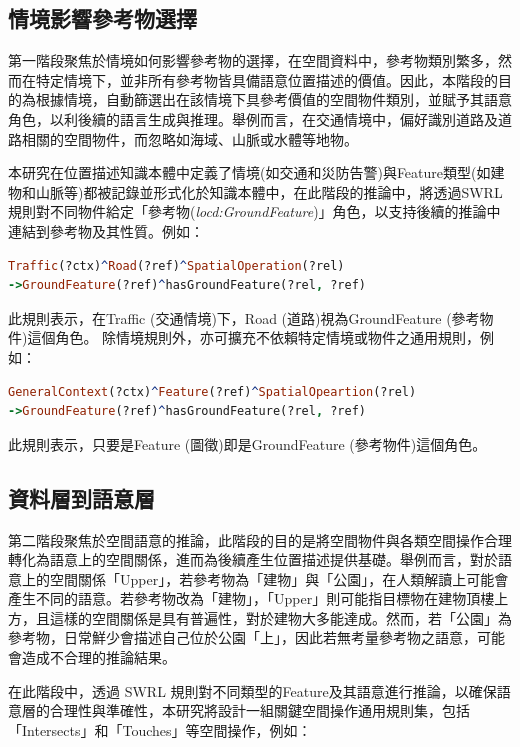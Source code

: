 \subsection{情境影響參考物選擇}

第一階段聚焦於情境如何影響參考物的選擇，在空間資料中，參考物類別繁多，然而在特定情境下，並非所有參考物皆具備語意位置描述的價值。因此，本階段的目的為根據情境，自動篩選出在該情境下具參考價值的空間物件類別，並賦予其語意角色，以利後續的語言生成與推理。舉例而言，在交通情境中，偏好識別道路及道路相關的空間物件，而忽略如海域、山脈或水體等地物。

本研究在位置描述知識本體中定義了情境(如交通和災防告警)與Feature類型(如建物和山脈等)都被記錄並形式化於知識本體中，在此階段的推論中，將透過SWRL規則對不同物件給定「參考物(\textit{locd:GroundFeature})」角色，以支持後續的推論中連結到參考物及其性質。例如：

\begin{lstlisting}[language=Prolog, basicstyle=\ttfamily, xleftmargin=2em]
Traffic(?ctx)^Road(?ref)^SpatialOperation(?rel) 
->GroundFeature(?ref)^hasGroundFeature(?rel, ?ref)
\end{lstlisting}

此規則表示，在Traffic (交通情境)下，Road (道路)視為GroundFeature (參考物件)這個角色。
除情境規則外，亦可擴充不依賴特定情境或物件之通用規則，例如：

\begin{lstlisting}[language=Prolog, basicstyle=\ttfamily, xleftmargin=2em]
GeneralContext(?ctx)^Feature(?ref)^SpatialOpeartion(?rel)
->GroundFeature(?ref)^hasGroundFeature(?rel, ?ref)
\end{lstlisting}

此規則表示，只要是Feature (圖徵)即是GroundFeature (參考物件)這個角色。

\subsection{資料層到語意層}

第二階段聚焦於空間語意的推論，此階段的目的是將空間物件與各類空間操作合理轉化為語意上的空間關係，進而為後續產生位置描述提供基礎。舉例而言，對於語意上的空間關係「Upper」，若參考物為「建物」與「公園」，在人類解讀上可能會產生不同的語意。若參考物改為「建物」，「Upper」則可能指目標物在建物頂樓上方，且這樣的空間關係是具有普遍性，對於建物大多能達成。然而，若「公園」為參考物，日常鮮少會描述自己位於公園「上」，因此若無考量參考物之語意，可能會造成不合理的推論結果。

在此階段中，透過 SWRL 規則對不同類型的Feature及其語意進行推論，以確保語意層的合理性與準確性，本研究將設計一組關鍵空間操作通用規則集，包括「Intersects」和「Touches」等空間操作，例如：

